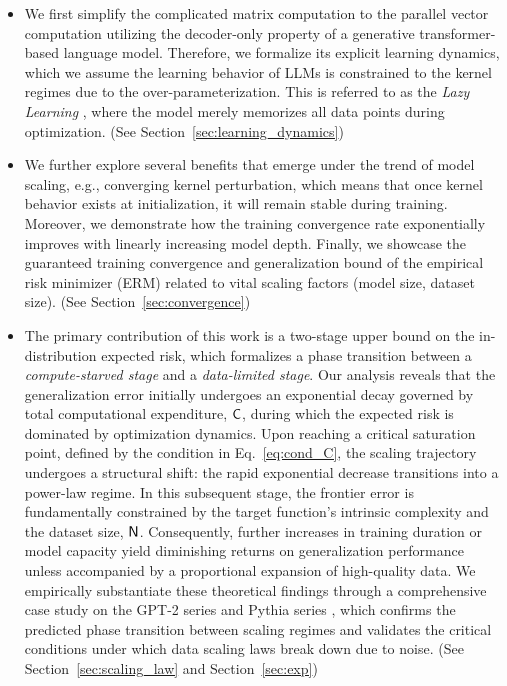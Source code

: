 \documentclass[11pt]{article}
\theoremstyle{plain}
\begin{document}
\begin{itemize}
    \item We first simplify the complicated matrix computation to the parallel vector computation utilizing the decoder-only property of a generative transformer-based language model. Therefore, we formalize its explicit learning dynamics, which we assume the learning behavior of LLMs is constrained to the kernel regimes due to the over-parameterization. This is referred to as the {\it Lazy Learning} \citep{jgh18, dzps19}, where the model merely memorizes all data points during optimization. (See Section~\ref{sec:learning_dynamics})
    \item We further explore several benefits that emerge under the trend of model scaling, e.g., converging kernel perturbation, which means that once kernel behavior exists at initialization, it will remain stable during training. Moreover, we demonstrate how the training convergence rate exponentially improves with linearly increasing model depth. Finally, we showcase the guaranteed training convergence and generalization bound of the empirical risk minimizer (ERM) related to vital scaling factors (model size, dataset size). (See Section~\ref{sec:convergence})
    \item The primary contribution of this work is a two-stage upper bound on the in-distribution expected risk, which formalizes a phase transition between a \textit{compute-starved stage} and a \textit{data-limited stage}. Our analysis reveals that the generalization error initially undergoes an exponential decay governed by total computational expenditure, ${\sf C}$, during which the expected risk is dominated by optimization dynamics. Upon reaching a critical saturation point, defined by the condition in Eq.~\eqref{eq:cond_C}, the scaling trajectory undergoes a structural shift: the rapid exponential decrease transitions into a power-law regime. In this subsequent stage, the frontier error is fundamentally constrained by the target function's intrinsic complexity and the dataset size, ${\sf N}$. Consequently, further increases in training duration or model capacity yield diminishing returns on generalization performance unless accompanied by a proportional expansion of high-quality data. We empirically substantiate these theoretical findings through a comprehensive case study on the GPT-2 series \cite{bmm+21} and Pythia series \cite{bsa+23}, which confirms the predicted phase transition between scaling regimes and validates the critical conditions under which data scaling laws break down due to noise.
    (See Section~\ref{sec:scaling_law} and Section~\ref{sec:exp})
\end{itemize}
\end{document}
